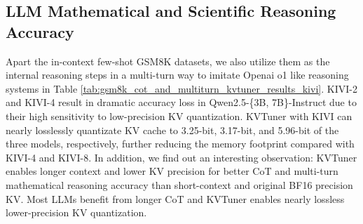 \subsection{LLM Mathematical and Scientific Reasoning Accuracy}
\label{sec:llm_mathmetical_reasoning_accuracy}
Apart the in-context few-shot GSM8K datasets, we also  utilize them as the internal reasoning steps in a multi-turn way to imitate Openai o1 like reasoning systems in Table \ref{tab:gsm8k_cot_and_multiturn_kvtuner_results_kivi}.
KIVI-2 and KIVI-4 result in dramatic accuracy loss in Qwen2.5-\{3B, 7B\}-Instruct due to their high sensitivity to low-precision KV quantization. KVTuner with KIVI can nearly losslessly quantizate KV cache to 3.25-bit, 3.17-bit, and 5.96-bit of the three models, respectively, further reducing the memory footprint compared with KIVI-4 and KIVI-8. In addition, we find out an interesting observation: KVTuner enables longer context and lower KV precision for better CoT and multi-turn mathematical reasoning accuracy than short-context and original BF16 precision KV. Most LLMs benefit from longer CoT and KVTuner enables nearly lossless lower-precision KV quantization.
